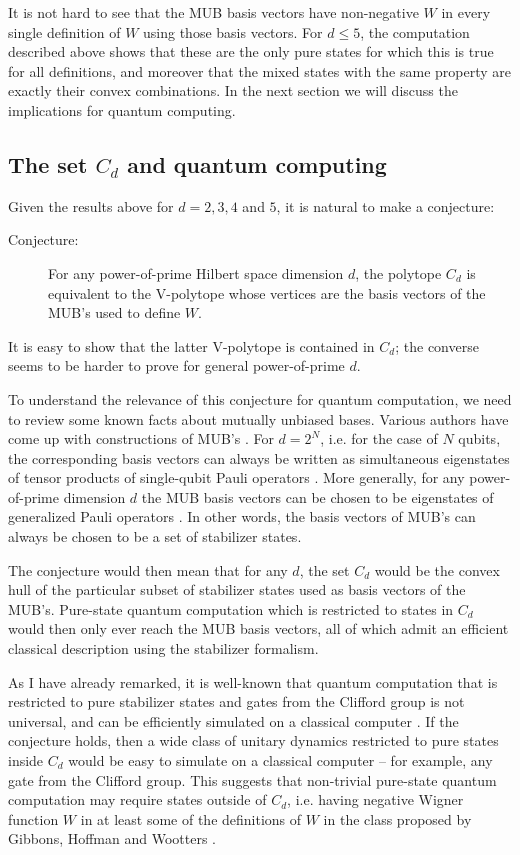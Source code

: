 \documentclass[aps,twocolumn,showpacs,nofootinbib,groupedaddress]{revtex4}
\begin{document}
It is not hard to see that the MUB basis vectors have non-negative
$W$ in every single definition of $W$ using those basis vectors.
For $d\le5$, the computation described above shows that these are
the only pure states for which this is true for all definitions,
and moreover that the mixed states with the same property are
exactly their convex combinations. In the next section we will
discuss the implications for quantum computing.

\subsection{The set $C_d$ and quantum computing}

Given the results above for $d=2,3,4$ and $5$, it is natural to
make a conjecture:
\begin{description}
\item[Conjecture:] For any power-of-prime Hilbert space dimension $d$, the polytope $C_d$ is equivalent to the V-polytope whose vertices are the basis vectors of the MUB's used to define $W$.
\end{description}
It is easy to show that the latter V-polytope is contained in
$C_d$; the converse seems to be harder to prove for general
power-of-prime $d$.

To understand the relevance of this conjecture for quantum
computation, we need to review some known facts about mutually
unbiased bases. Various authors have come up with constructions of
MUB's
\cite{Ivanovic81,WoottersF89,BandyopadhyayBRV02,LawrenceBZ02,PittengerR03,KlappeneckerR04}.
For $d=2^N$, i.e. for the case of $N$ qubits, the corresponding
basis vectors can always be written as simultaneous eigenstates of
tensor products of single-qubit Pauli operators
\cite{LawrenceBZ02}. More generally, for any power-of-prime
dimension $d$ the MUB basis vectors can be chosen to be
eigenstates of generalized Pauli operators
\cite{PittengerR00,BandyopadhyayBRV02}. In other words, the basis
vectors of MUB's can always be chosen to be a set of stabilizer
states.

The conjecture would then mean that for any $d$, the set $C_d$
would be the convex hull of the particular subset of stabilizer
states used as basis vectors of the MUB's. Pure-state quantum
computation which is restricted to states in $C_d$ would then only
ever reach the MUB basis vectors, all of which admit an efficient
classical description using the stabilizer formalism.

As I have already remarked, it is well-known that quantum
computation that is restricted to pure stabilizer states and gates
from the Clifford group is not universal, and can be efficiently
simulated on a classical computer \cite{Gottesman97}. If the
conjecture holds, then a wide class of unitary dynamics restricted
to pure states inside $C_d$ would be easy to simulate on a
classical computer -- for example, any gate from the Clifford
group. This suggests that non-trivial pure-state quantum
computation may require states outside of $C_d$, i.e. having
negative Wigner function $W$ in at least some of the definitions
of $W$ in the class proposed by Gibbons, Hoffman and Wootters
\cite{GibbonsHW04}.
\end{document}
